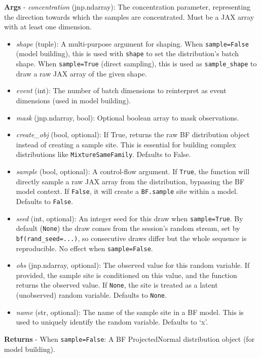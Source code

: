 \documentclass[
  letterpaper,
  DIV=11,
  numbers=noendperiod]{scrartcl}
\begin{document}
\textbf{Args} - \emph{concentration} (jnp.ndarray): The concentration
parameter, representing the direction towards which the samples are
concentrated. Must be a JAX array with at least one dimension.

\begin{itemize}
\item
  \emph{shape} (tuple): A multi-purpose argument for shaping. When
  \texttt{sample=False} (model building), this is used with
  \texttt{shape} to set the distribution's batch shape. When
  \texttt{sample=True} (direct sampling), this is used as
  \texttt{sample\_shape} to draw a raw JAX array of the given shape.
\item
  \emph{event} (int): The number of batch dimensions to reinterpret as
  event dimensions (used in model building).
\item
  \emph{mask} (jnp.ndarray, bool): Optional boolean array to mask
  observations.
\item
  \emph{create\_obj} (bool, optional): If True, returns the raw BF
  distribution object instead of creating a sample site. This is
  essential for building complex distributions like
  \texttt{MixtureSameFamily}. Defaults to False.
\item
  \emph{sample} (bool, optional): A control-flow argument. If
  \texttt{True}, the function will directly sample a raw JAX array from
  the distribution, bypassing the BF model context. If \texttt{False},
  it will create a \texttt{BF.sample} site within a model. Defaults to
  \texttt{False}.
\item
  \emph{seed} (int, optional): An integer seed for this draw when
  \texttt{sample=True}. By default (\texttt{None}) the draw comes from
  the session's random stream, set by \texttt{bf(rand\_seed=...)}, so
  consecutive draws differ but the whole sequence is reproducible. No
  effect when \texttt{sample=False}.
\item
  \emph{obs} (jnp.ndarray, optional): The observed value for this random
  variable. If provided, the sample site is conditioned on this value,
  and the function returns the observed value. If \texttt{None}, the
  site is treated as a latent (unobserved) random variable. Defaults to
  \texttt{None}.
\item
  \emph{name} (str, optional): The name of the sample site in a BF
  model. This is used to uniquely identify the random variable. Defaults
  to `x'.
\end{itemize}

\textbf{Returns} - When \texttt{sample=False}: A BF ProjectedNormal
distribution object (for model building).
\end{document}

